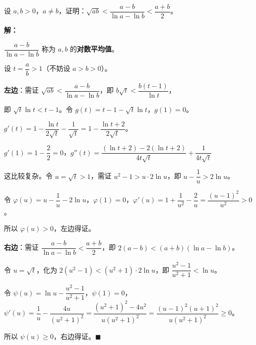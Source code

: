 \documentclass[12pt, a4paper]{ctexart}
\begin{document}
\begin{examplebox}
设 $a,b>0$，$a\neq b$，证明：$\sqrt{ab} < \dfrac{a-b}{\ln a - \ln b} < \dfrac{a+b}{2}$。

\textbf{解：}

$\dfrac{a-b}{\ln a-\ln b}$ 称为 $a,b$ 的\textbf{对数平均值}。

设 $t=\dfrac{a}{b}>1$（不妨设 $a>b>0$）。

\textbf{左边}：需证 $\sqrt{ab}<\dfrac{a-b}{\ln a-\ln b}$，即 $b\sqrt{t}<\dfrac{b(t-1)}{\ln t}$，

即 $\sqrt{t}\ln t<t-1$。令 $g(t)=t-1-\sqrt{t}\ln t$，$g(1)=0$。

$g'(t)=1-\dfrac{\ln t}{2\sqrt{t}}-\dfrac{1}{\sqrt{t}}=1-\dfrac{\ln t+2}{2\sqrt{t}}$。

$g'(1)=1-\dfrac{2}{2}=0$，$g''(t)=\dfrac{(\ln t+2)-2(\ln t+2)}{4t\sqrt{t}}+\dfrac{1}{4t\sqrt{t}}$

这比较复杂。令 $u=\sqrt{t}>1$，需证 $u^2-1>u\cdot 2\ln u$，即 $u-\dfrac{1}{u}>2\ln u$。

令 $\varphi(u)=u-\dfrac{1}{u}-2\ln u$，$\varphi(1)=0$，$\varphi'(u)=1+\dfrac{1}{u^2}-\dfrac{2}{u}=\dfrac{(u-1)^2}{u^2}>0$。

所以 $\varphi(u)>0$，左边得证。

\textbf{右边}：需证 $\dfrac{a-b}{\ln a-\ln b}<\dfrac{a+b}{2}$，即 $2(a-b)<(a+b)(\ln a-\ln b)$。

令 $u=\sqrt{t}$，化为 $2(u^2-1)<(u^2+1)\cdot 2\ln u$，即 $\dfrac{u^2-1}{u^2+1}<\ln u$。

令 $\psi(u)=\ln u-\dfrac{u^2-1}{u^2+1}$，$\psi(1)=0$，$\psi'(u)=\dfrac{1}{u}-\dfrac{4u}{(u^2+1)^2}=\dfrac{(u^2+1)^2-4u^2}{u(u^2+1)^2}=\dfrac{(u-1)^2(u+1)^2}{u(u^2+1)^2}\geq 0$。

所以 $\psi(u)\geq 0$，右边得证。$\blacksquare$
\end{examplebox}
\end{document}
